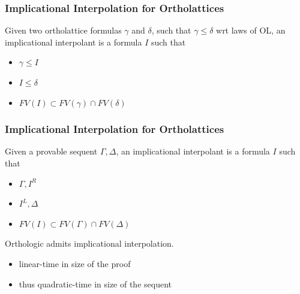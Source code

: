 \documentclass[
    aspectratio=169,
    xcolor={dvipsnames},
]{beamer}
\begin{document}
\begin{frame}
    \frametitle{Implicational Interpolation for Ortholattices}


    Given two ortholattice formulas \(\gamma\) and \(\delta\), such that
    \(\gamma \leq \delta\) wrt laws of OL, an implicational interpolant is a
    formula \(I\) such that

    \begin{itemize}
        \item \(\gamma \leq I\)
        \item \(I \leq \delta\)
        \item \(FV(I) \subset FV(\gamma) \cap FV(\delta)\)
    \end{itemize}

\end{frame}

\begin{frame}
    \frametitle{Implicational Interpolation for Ortholattices}

    Given a provable sequent \(\Gamma, \Delta\), an implicational interpolant is
    a formula \(I\) such that

    \begin{itemize}
        \item \(\Gamma, I^R\)
        \item \(I^L, \Delta\)
        \item \(FV(I) \subset FV(\Gamma) \cap FV(\Delta)\)
    \end{itemize}

    \pause

    \begin{theorem}
        Orthologic admits implicational interpolation.
    \end{theorem}

    \pause
    \begin{itemize}
        \item linear-time in size of the proof
        \item thus quadratic-time in size of the sequent
    \end{itemize}
    
\end{frame}
\end{document}
